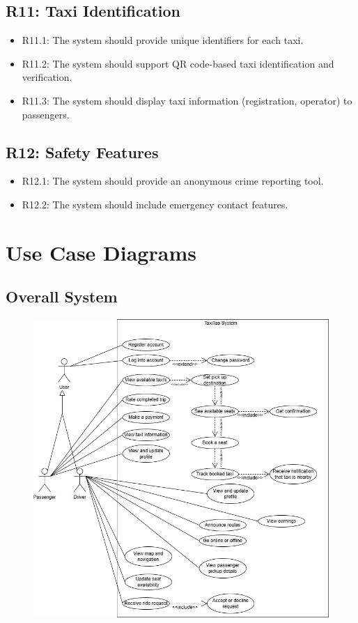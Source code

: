 \documentclass[a4paper,12pt]{article}
\begin{document}
\subsection*{R11: Taxi Identification}
\begin{itemize}
    \item R11.1: The system should provide unique identifiers for each taxi.
    \item R11.2: The system should support QR code-based taxi identification and verification.
    \item R11.3: The system should display taxi information (registration, operator) to passengers.
\end{itemize}

\subsection*{R12: Safety Features}
\begin{itemize}
    \item R12.1: The system should provide an anonymous crime reporting tool.
    \item R12.2: The system should include emergency contact features.
\end{itemize}

\section{Use Case Diagrams}
  \subsection*{Overall System}
    \begin{figure}[H]
      \centering
      \includegraphics[width=1\textwidth]{TaxiTap App.jpg} 
    \end{figure}
\end{document}
